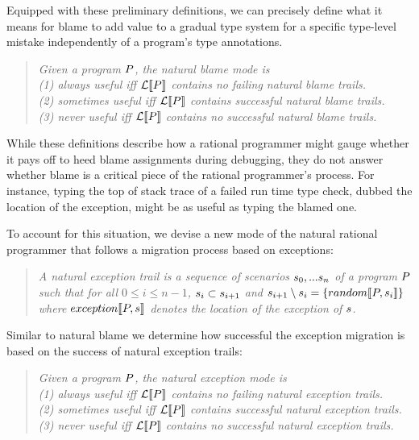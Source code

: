 Equipped with these preliminary definitions, we can precisely define what it means
for blame to add value to a gradual type system for a specific
type-level mistake independently of a program's type annotations. 
\begin{quote}
\it
Given a program $P$, the natural blame mode is\\
(1) \emph{always useful} iff $\mathcal{L}\llbracket P\rrbracket$ contains no failing natural blame trails.\\
(2) \emph{sometimes useful} iff $\mathcal{L}\llbracket P\rrbracket$ contains successful natural blame trails.\\
(3) \emph{never useful} iff $\mathcal{L}\llbracket P\rrbracket$ contains no successful natural blame
trails.\\
\end{quote}

While these definitions describe how a rational programmer might gauge whether it
pays off to heed blame assignments during debugging, they do not answer whether
blame is a critical piece of the rational programmer's process.  For instance,
typing the top of stack trace of a failed run time type check, dubbed the
location of the exception, might be as useful as typing the blamed one.

To account for this situation, we devise a new mode of the natural rational
programmer that follows a migration process based on exceptions:
\begin{quote}
\it A natural exception trail is a sequence of scenarios $s_0,...s_n$ of a
program $P$ such that for all $0 \leq i \leq n - 1$, $s_i \subset
s_{i+1}$ and $s_{i+1} \setminus s_i = \{random\llbracket P, s_i\rrbracket\}$
where $exception\llbracket P, s\rrbracket$ denotes the location of the exception of $s$.
\end{quote}
Similar to natural blame we determine how successful the exception
migration is based on the success of natural exception trails: 
\begin{quote}
\it
Given a program $P$, the natural exception mode is\\
(1) \emph{always useful} iff $\mathcal{L}\llbracket P\rrbracket$ contains no failing
  natural exception trails.\\
(2) \emph{sometimes useful} iff $\mathcal{L}\llbracket P\rrbracket$ contains successful
  natural exception trails.\\
(3) \emph{never useful} iff $\mathcal{L}\llbracket P\rrbracket$ contains no successful natural
exception trails.\\
\end{quote}

